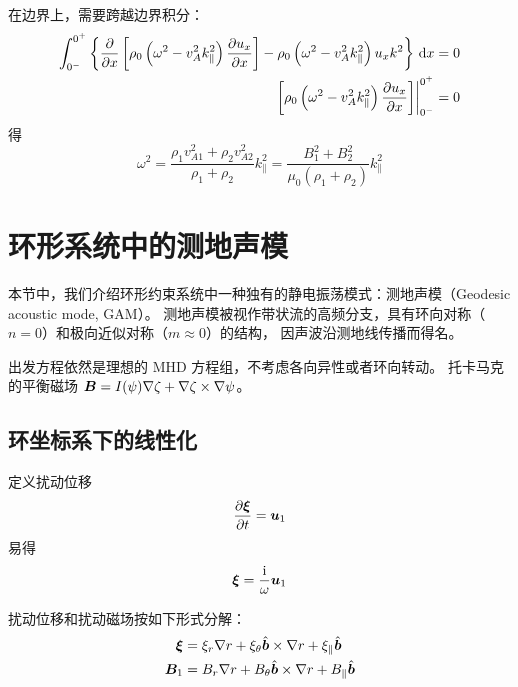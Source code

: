 在边界上，需要跨越边界积分：
\begin{equation}\begin{aligned}
\int_{0^-}^{0^+} \left\{
    \frac{\partial {}}{\partial {x}} \left[ \rho_0 \left( \omega^2 - v_A^2 k_\parallel^2 \right) \frac{\partial {u_x}}{\partial {x}} \right]
    - \rho_0 \left( \omega^2 - v_A^2 k_\parallel^2 \right) u_x k^2
\right\} \, \mathop{}\!\mathrm{d} x &=0 \\
\left.\left[
    \rho_0 \left( \omega^2 - v_A^2 k_\parallel^2 \right) \frac{\partial {u_x}}{\partial {x}}
\right]\right|_{0^-}^{0^+} &= 0
\end{aligned}\end{equation}
得
\begin{equation}
\omega^2 = \frac{\rho_1 v_{A1}^2 + \rho_2 v_{A2}^2}{\rho_1 + \rho_2} k_\parallel^2
= \frac{B_1^2 + B_2^2}{\mu_0 \left(\rho_1 + \rho_2\right)} k_\parallel^2
\end{equation}

\section{环形系统中的测地声模}

本节中，我们介绍环形约束系统中一种独有的静电振荡模式：测地声模（Geodesic acoustic mode, GAM）。
测地声模被视作带状流的高频分支，具有环向对称（$n = 0$）和极向近似对称（$m \approx 0$）的结构，
因声波沿测地线传播而得名。

出发方程依然是理想的 MHD 方程组，不考虑各向异性或者环向转动。
托卡马克的平衡磁场 $\bm{B} = I(\psi) \nabla {\zeta} + \nabla {\zeta} \times \nabla {\psi} $。

\subsection{环坐标系下的线性化}

定义扰动位移
\begin{equation}
\frac{\partial {\bm{\xi}}}{\partial {t}} = \bm{u}_1
\end{equation}
易得
\begin{equation}
\bm{\xi} = \frac{\mathrm{i}}{\omega} \bm{u}_1
\end{equation}

扰动位移和扰动磁场按如下形式分解：
\begin{subequations}\begin{align}
\bm{\xi} &
= \xi_r \nabla {r}
+ \xi_\theta \hat{\bm{b}} \times \nabla {r}
+ \xi_\parallel \hat{\bm{b}} \\
\bm{B}_1 &
= B_r \nabla {r}
+ B_\theta \hat{\bm{b}} \times \nabla {r}
+ B_\parallel \hat{\bm{b}}
\end{align}\end{subequations}

